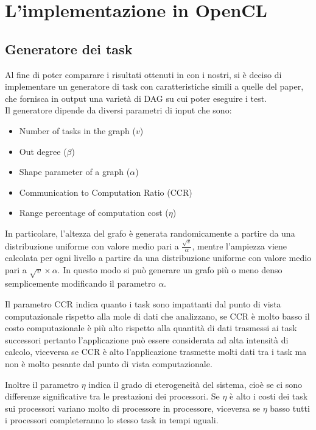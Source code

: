 \chapter{L'implementazione in OpenCL}\label{capitolo4codice}
\vspace{4cm}


\section{Generatore dei task}
Al fine di poter comparare i risultati ottenuti in \cite{ilavarasan2007low} con i nostri, si è deciso di implementare un generatore di task con caratteristiche simili a quelle del paper, che fornisca in output una varietà di DAG su cui poter eseguire i test.
\\
Il generatore dipende da diversi parametri di input che sono:
\begin{itemize}
	\item{Number of tasks in the graph ($v$)}
	\item{Out degree ($\beta$)}
	\item{Shape parameter of a graph ($\alpha$)}
	\item{Communication to Computation Ratio (CCR)}
	\item{Range percentage of computation cost ($\eta$)}
\end{itemize}

In particolare, l'altezza del grafo è generata randomicamente a partire da una distribuzione uniforme con valore medio pari a $\frac{\sqrt{v}}{\alpha}$, mentre l'ampiezza viene calcolata per ogni livello a partire da una distribuzione uniforme con valore medio pari a $\sqrt{v}\times\alpha$.
In questo modo si può generare un grafo più o meno denso semplicemente modificando il parametro $\alpha$.

Il parametro CCR indica quanto i task sono impattanti dal punto di vista computazionale rispetto alla mole di dati che analizzano, se CCR è molto basso il costo computazionale è più alto rispetto alla quantità di dati trasmessi ai task successori pertanto l'applicazione può essere considerata ad alta intensità di calcolo, viceversa se CCR è alto l'applicazione trasmette molti dati tra i task ma non è molto pesante dal punto di vista computazionale.

Inoltre il parametro $\eta$ indica il grado di eterogeneità del sistema, cioè se ci sono differenze significative tra le prestazioni dei processori. Se $\eta$ è alto i costi dei task sui processori variano molto di processore in processore, viceversa se $\eta$ basso tutti i processori completeranno lo stesso task in tempi uguali. 

